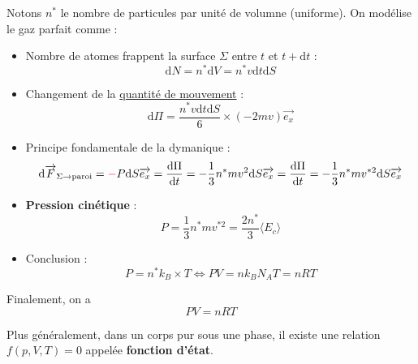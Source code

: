 \documentclass{report}
\begin{document}
Notons $n ^{*}$ le nombre de particules par unité de volumne (uniforme). On modélise le gaz parfait comme :
\begin{itemize}

    \item Nombre de atomes frappent la surface $\Sigma$ entre $t$ et $t + \mathrm{d} t$ : 
      \begin{equation}
        \mathrm{d} N = n ^{*} \mathrm{d}V = n ^{*} v \mathrm{d} t \mathrm{d} S
      \end{equation}

    \item Changement de la \underline{quantité de mouvement} : 
      \begin{equation}
        \mathrm{d} \Pi = \frac{n ^{*} v \mathrm{d}t \mathrm{d}S}{6}  \times (-2m v) \overrightarrow{e_x}
      \end{equation}

    \item Principe fondamentale de la dymanique : 
      \begin{equation}
        \mathrm{d} \overrightarrow{F} _{\Sigma \to \text{paroi}}= {\color{red} -} P \mathrm{d} S \overrightarrow{e_x} = \frac{\mathrm{d} \Pi}{\mathrm{d} t} = - \frac{1}{3}  n ^{*} mv ^{2} \mathrm{d}S \overrightarrow{e_x} = \frac{\mathrm{d} \Pi}{\mathrm{d} t} = - \frac{1}{3}  n ^{*} mv ^{*2} \mathrm{d}S \overrightarrow{e_x}
      \end{equation}

    \item \textbf{Pression cinétique} : 
      \begin{equation}
        P = \frac{1}{3}  n ^{*} m v ^{*2} = \frac{2n ^{*}}{3}  \langle E _{c} \rangle
      \end{equation}

    \item Conclusion : 
      \begin{equation}
        P = n ^{*}k_B \times T \iff PV = nk_BN_AT = nRT
      \end{equation}

\end{itemize}

Finalement, on a 
\begin{equation}
  PV = nRT
\end{equation}

Plus généralement, dans un corps pur sous une phase, il existe une relation $f(p, V, T) = 0$ appelée \textbf{fonction d'état}.
        




\end{document}
